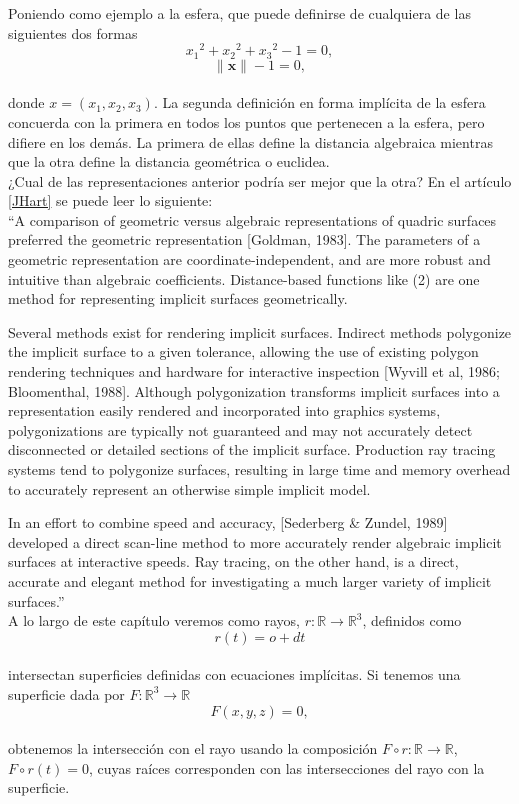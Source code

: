 Poniendo como ejemplo a la esfera, que puede definirse de cualquiera de las siguientes dos formas
${ }$\\
$$ {x_1}^2 + {x_2}^2 + {x_3}^2 -1 = 0, $$
$$ \lVert \mathbf{x} \rVert -1 = 0, $$
${ }$\\
donde $x = (x_1, x_2, x_3)$. La segunda definición en forma implícita de la esfera concuerda con la primera en todos los puntos que pertenecen a la esfera, pero difiere en los demás. La primera de ellas define la distancia algebraica mientras que la otra define la distancia geométrica o euclidea.
${ }$\\

¿Cual de las representaciones anterior podría ser mejor que la otra? En el artículo \ref{JHart} se puede leer lo siguiente:
${ }$\\

``A comparison of geometric versus algebraic representations of quadric surfaces preferred the geometric representation [Goldman, 1983]. The parameters of a geometric representation are coordinate-independent, and are more robust and intuitive than algebraic coefficients. Distance-based functions like (2) are one method for representing implicit surfaces geometrically.

Several methods exist for rendering implicit surfaces. Indirect methods polygonize the implicit surface to a given tolerance, allowing the use of existing polygon rendering techniques and hardware for interactive inspection [Wyvill et al, 1986; Bloomenthal, 1988]. Although polygonization transforms implicit surfaces into a representation easily rendered and incorporated into graphics systems, polygonizations are typically not guaranteed and may not accurately detect disconnected or detailed sections of the implicit surface. Production ray tracing systems tend to polygonize surfaces, resulting in large time and memory overhead to accurately represent an otherwise simple implicit model.

In an effort to combine speed and accuracy, [Sederberg \& Zundel, 1989] developed a direct scan-line method to more accurately render algebraic implicit surfaces at interactive speeds. Ray tracing, on the other hand, is a direct, accurate and elegant method for investigating a much larger variety of implicit surfaces.''
${ }$\\

A lo largo de este capítulo veremos como rayos, $ r : \mathbb{R} \to \mathbb{R}^3$, definidos como
${ }$\\
$$ r(t) = o + dt $$
${ }$\\
intersectan superficies definidas con ecuaciones implícitas. Si tenemos una superficie dada por $ F : \mathbb{R}^3 \to \mathbb{R} $
${ }$\\
$$ F(x,y,z) = 0, $$
${ }$\\
obtenemos la intersección con el rayo usando la composición $F \circ r : \mathbb{R} \to \mathbb{R}$, $F \circ r (t) = 0$, cuyas raíces corresponden con las intersecciones del rayo con la superficie.
${ }$\\

